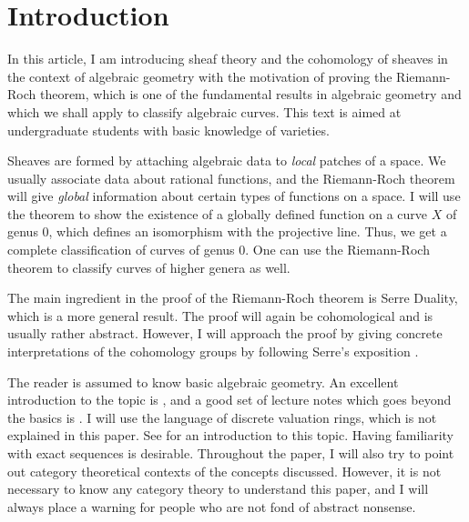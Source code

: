 \section*{Introduction}
In this article, I am introducing sheaf theory and the cohomology of
sheaves in the context of algebraic geometry with the motivation of proving
the Riemann-Roch theorem, which is one of the fundamental results in
algebraic geometry and which we shall apply to classify algebraic curves.
This text is aimed at undergraduate students with basic knowledge of varieties.

Sheaves are formed by attaching algebraic data to \emph{local} patches of 
a space. We usually associate data about rational functions, and 
the Riemann-Roch theorem will give \emph{global} information about certain 
types of functions on a space. I will use the theorem to show the existence 
of a globally defined function on a curve $X$ of genus 0, which defines 
an isomorphism with the projective line. Thus, we get a complete 
classification of curves of genus 0. One can use the Riemann-Roch theorem 
to classify curves of higher genera as well.

The main ingredient in the proof of the Riemann-Roch theorem is Serre
Duality, which is a more general result. The proof will again
be cohomological and is usually rather abstract. However, I will
approach the proof by giving concrete interpretations of
the cohomology groups by following Serre's exposition \cite{serre}.

The reader is assumed to know basic algebraic geometry. An excellent
introduction to the topic is \cite{reid}, and a good set of lecture notes
which goes beyond the basics is \cite{gathmann}. I will use the language
of discrete valuation rings, which is not explained in this paper. See
\cite{fulton} %
for an introduction to this topic. Having familiarity with 
exact sequences is desirable. Throughout
the paper, I will also try to point out category theoretical contexts of
the concepts discussed. However, it is not necessary to know any category
theory to understand this paper, and I will always place a warning for
people who are not fond of abstract nonsense.
